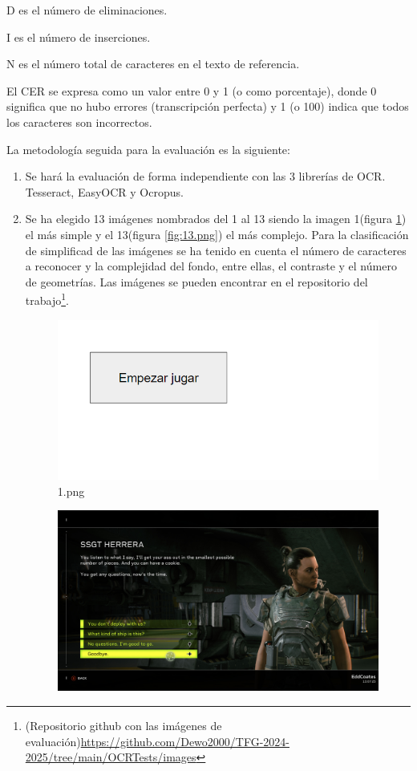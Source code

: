 D es el número de eliminaciones.

I es el número de inserciones.

N es el número total de caracteres en el texto de referencia.

El CER se expresa como un valor entre 0 y 1 (o como porcentaje), donde 0 significa que no hubo errores (transcripción perfecta) y 1 (o 100) indica que todos los caracteres son incorrectos.

La metodología seguida para la evaluación es la siguiente:

\begin{enumerate}
	\item Se hará la evaluación de forma independiente con las 3 librerías de OCR. Tesseract, EasyOCR y Ocropus.
	\item Se ha elegido 13 imágenes nombrados del 1 al 13 siendo la imagen 1(figura \ref{fig:1.png}) el más simple y el 13(figura \ref{fig:13.png}) el más complejo. Para la clasificación de simplificad de las imágenes se ha tenido en cuenta el número de caracteres a reconocer y la complejidad del fondo, entre ellas, el contraste y el número de geometrías.
	Las imágenes se pueden encontrar en el repositorio del trabajo\footnote{(Repositorio github con las imágenes de evaluación)\url{https://github.com/Dewo2000/TFG-2024-2025/tree/main/OCRTests/images}}.
	\begin{figure}[H]
		\centering
		\includegraphics[width = 1\textwidth]{Imagenes/Evaluacion_OCR/1.png}
		\caption{1.png}
		\label{fig:1.png}
	\end{figure}
	\begin{figure}[H]
		\centering
		\includegraphics[width = 1\textwidth]{Imagenes/Evaluacion_OCR/13.png}

\end{figure}
\end{enumerate}
